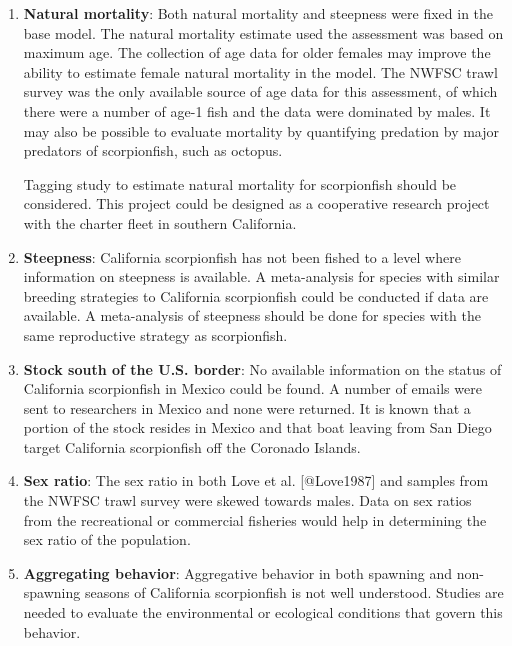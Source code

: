 \documentclass[12pt,]{article}
\begin{document}
\begin{enumerate}

\item \textbf{Natural mortality}: Both natural mortality and steepness were 
fixed in the base model.  The natural mortality estimate used the assessment 
was based on maximum age. The collection of age data for older females may improve 
the ability to estimate female natural mortality in the model.  The NWFSC trawl survey
was the only available source of age data for this assessment, of which there were a 
number of age-1 fish and the data were dominated by males.  It may also be possible 
to evaluate mortality by quantifying predation by major predators of scorpionfish, 
such as octopus. 

Tagging study to estimate natural mortality for scorpionfish should be 
considered.  This project could be designed as a cooperative research project 
with the charter fleet in southern California.

\item \textbf{Steepness}: California scorpionfish has not been fished to a level 
where information on steepness is available.  A meta-analysis for species 
with similar breeding strategies to California scorpionfish could be conducted if data are available.  A meta-analysis of steepness should be done for species with the same reproductive strategy as scorpionfish.


\item \textbf{Stock south of the U.S. border}:  No available information on the status of California scorpionfish in Mexico could be found.  A number of emails were sent to researchers 
in Mexico and none were returned.  It is known that a portion of the stock resides 
in Mexico and that boat leaving from San Diego target California scorpionfish off 
the Coronado Islands.  

\item \textbf{Sex ratio}:  The sex ratio in both Love et al. [@Love1987] and samples 
from the NWFSC trawl survey were skewed towards males. Data on sex ratios from the 
recreational or commercial fisheries would help in determining the sex ratio of the population.


\item \textbf{Aggregating behavior}: Aggregative behavior in both spawning and 
non-spawning seasons of California scorpionfish is not well understood. Studies are 
needed to evaluate the environmental or ecological conditions that govern this behavior.




\end{enumerate}
\end{document}
